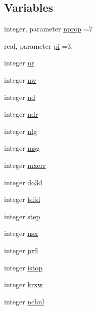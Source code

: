\subsection*{Variables}
\begin{DoxyCompactItemize}
\item 
integer, parameter \hyperlink{namespacemg__input__routines_acf657285a9116a36f49eb1716a79e4f7}{nprop} =7
\item 
real, parameter \hyperlink{namespacemg__input__routines_a6019c1c31f9a86b8262747f0a7135528}{pi} =3.
\item 
integer \hyperlink{namespacemg__input__routines_a14058337aef87178d8a8d770a11a66d9}{nr}
\item 
integer \hyperlink{namespacemg__input__routines_ab9a730544640a32be864e9b3dda89e4e}{nw}
\item 
integer \hyperlink{namespacemg__input__routines_a310ddcda277a3a2743d7709cccdf9007}{nd}
\item 
integer \hyperlink{namespacemg__input__routines_a494cce161b67dc2a3a628e7ce33d35d0}{ndr}
\item 
integer \hyperlink{namespacemg__input__routines_a02fb693b7d09302d47008f0a381ea329}{nlg}
\item 
integer \hyperlink{namespacemg__input__routines_a6485fb3eba9b87bb80aaac69bb342695}{msg}
\item 
integer \hyperlink{namespacemg__input__routines_a079d18c936f009ac6113cc598db36422}{mxerr}
\item 
integer \hyperlink{namespacemg__input__routines_abccc4c4d25850b657fcca7f97c1e6059}{do3d}
\item 
integer \hyperlink{namespacemg__input__routines_aa14409c0d31135d57aeebe18372c39f0}{tdfd}
\item 
integer \hyperlink{namespacemg__input__routines_a60b46446ed51344037d5a78ec02b800d}{step}
\item 
integer \hyperlink{namespacemg__input__routines_a93ce77d2c22f2c7c842adeed015927ab}{nsx}
\item 
integer \hyperlink{namespacemg__input__routines_a8b4df2339b6d8cbb2d403d9ec0966b14}{prfl}
\item 
integer \hyperlink{namespacemg__input__routines_a7d3adc6f4d1d09319400a6a90b644ccf}{istop}
\item 
integer \hyperlink{namespacemg__input__routines_a689c313caea9666b0564a35579678ce1}{krxw}
\item 
integer \hyperlink{namespacemg__input__routines_a29d81574f8ee97737139da90c94a3614}{nchnl}
\item 

\end{DoxyCompactItemize}
